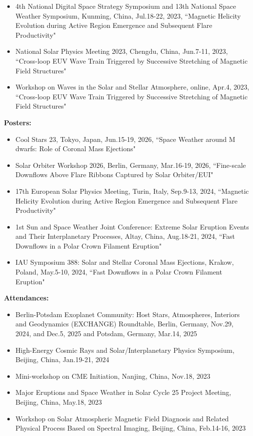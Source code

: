 \documentclass{resume}
\begin{document}
\begin{itemize}
\item 4th National Digital Space Strategy Symposium and 13th National Space Weather Symposium, Kunming, China, Jul.18-22, 2023, ``Magnetic Helicity Evolution during Active Region Emergence and Subsequent Flare Productivity" 
\item National Solar Physics Meeting 2023, Chengdu, China, Jun.7-11, 2023, ``Cross-loop EUV Wave Train Triggered by Successive Stretching of Magnetic Field Structures"  
\item Workshop on Waves in the Solar and Stellar Atmosphere, online, Apr.4, 2023, ``Cross-loop EUV Wave Train Triggered by Successive Stretching of Magnetic Field Structures"  
\end{itemize}

\textbf{Posters:}
\begin{itemize}
\item Cool Stars 23, Tokyo, Japan, Jun.15-19, 2026, ``Space Weather around M dwarfs: Role of Coronal Mass Ejections"
\item Solar Orbiter Workshop 2026, Berlin, Germany, Mar.16-19, 2026, ``Fine-scale Downflows Above Flare Ribbons Captured by Solar Orbiter/EUI"
\item 17th European Solar Physics Meeting, Turin, Italy, Sep.9-13, 2024, ``Magnetic Helicity Evolution during Active Region Emergence and Subsequent Flare Productivity" 
\item 1st Sun and Space Weather Joint Conference: Extreme Solar Eruption Events and Their Interplanetary Processes, Altay, China, Aug.18-21, 2024, ``Fast Downflows in a Polar Crown Filament Eruption"
\item IAU Symposium 388: Solar and Stellar Coronal Mass Ejections, Krakow, Poland, May.5-10, 2024, ``Fast Downflows in a Polar Crown Filament Eruption" 
\end{itemize}



\textbf{Attendances:}
\begin{itemize}
\item Berlin-Potsdam Exoplanet Community: Host Stars, Atmospheres, Interiors and Geodynamics (EXCHANGE) Roundtable, Berlin, Germany, Nov.29, 2024, and Dec.5, 2025 and Potsdam, Germany, Mar.14, 2025
\item High-Energy Cosmic Rays and Solar/Interplanetary Physics Symposium, Beijing, China, Jan.19-21, 2024
\item Mini-workshop on CME Initiation, Nanjing, China, Nov.18, 2023
\item Major Eruptions and Space Weather in Solar Cycle 25 Project Meeting, Beijing, China, May.18, 2023
\item Workshop on Solar Atmospheric Magnetic Field Diagnosis and Related Physical Process Based on Spectral Imaging, Beijing, China, Feb.14-16, 2023
\end{itemize}
\end{document}
